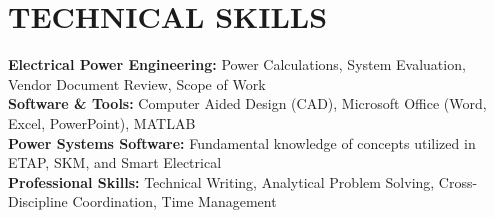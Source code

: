 \documentclass[letterpaper,11pt]{article}
\begin{document}
\section{TECHNICAL SKILLS}
 \begin{itemize}[leftmargin=0.15in, label={}]
    \small{\item{
     \textbf{Electrical Power Engineering:} Power Calculations, System Evaluation, Vendor Document Review, Scope of Work \\
     \textbf{Software \& Tools:} Computer Aided Design (CAD), Microsoft Office (Word, Excel, PowerPoint), MATLAB \\
     \textbf{Power Systems Software:} Fundamental knowledge of concepts utilized in ETAP, SKM, and Smart Electrical \\
     \textbf{Professional Skills:} Technical Writing, Analytical Problem Solving, Cross-Discipline Coordination, Time Management
    }}
 \end{itemize}


\end{document}
